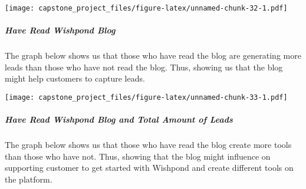 \documentclass[]{article}
\newenvironment{Shaded}{\begin{snugshade}}{\end{snugshade}}
\newcommand{\KeywordTok}[1]{\textcolor[rgb]{0.13,0.29,0.53}{\textbf{#1}}}
\newcommand{\DataTypeTok}[1]{\textcolor[rgb]{0.13,0.29,0.53}{#1}}
\newcommand{\DecValTok}[1]{\textcolor[rgb]{0.00,0.00,0.81}{#1}}
\newcommand{\StringTok}[1]{\textcolor[rgb]{0.31,0.60,0.02}{#1}}
\newcommand{\OperatorTok}[1]{\textcolor[rgb]{0.81,0.36,0.00}{\textbf{#1}}}
\newcommand{\NormalTok}[1]{#1}
\let\oldsubparagraph\subparagraph
\renewcommand{\subparagraph}[1]{\oldsubparagraph{#1}\mbox{}}
\begin{document}
\texttt{[image: capstone\_project\_files/figure-latex/unnamed-chunk-32-1.pdf]}

\subparagraph{Have Read Wishpond Blog}\label{have-read-wishpond-blog}

The graph below shows us that those who have read the blog are
generating more leads than those who have not read the blog. Thus,
showing us that the blog might help customers to capture leads.

\begin{Shaded}
\end{Shaded}

\texttt{[image: capstone\_project\_files/figure-latex/unnamed-chunk-33-1.pdf]}

\subparagraph{Have Read Wishpond Blog and Total Amount of
Leads}\label{have-read-wishpond-blog-and-total-amount-of-leads}

The graph below shows us that those who have read the blog create more
tools than those who have not. Thus, showing that the blog might
influence on supporting customer to get started with Wishpond and create
different tools on the platform.
\end{document}
